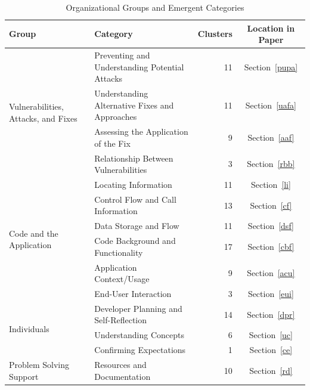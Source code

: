 \documentclass[10pt,journal,compsoc]{IEEEtran}
\begin{document}
\begin{table} 
	\centering
	\caption{Organizational Groups and Emergent Categories}
	\begin{tabularx}{\textwidth}{|l|X|r|c|}
		\rowcolor{gray!50}
		\hline
		Group											& Category										& Clusters		& Location in Paper	  	\\
		\hline			
		\multirow{4}{*}{Vulnerabilities, Attacks, and Fixes}
		& Preventing and Understanding Potential Attacks	& 11     		& Section~\ref{pupa}		\\
		
		& Understanding Alternative Fixes and Approaches	& 11     		& Section~\ref{uafa}	\\
		
		& Assessing the Application of the Fix				& 9     		& Section~\ref{aaf}				\\
		
		& Relationship Between Vulnerabilities							& 3     		& Section~\ref{rbb}			\\
		\hline
		\multirow{6}{*}{Code and the Application}	
		& Locating Information 								& 11      		& Section~\ref{li}		\\
		
		& Control Flow and Call Information					& 13     		& Section~\ref{cf}	\\
		
		& Data Storage and Flow								& 11     		& Section~\ref{dsf}  	\\
		
		& Code Background and Functionality	 				& 17     		& Section~\ref{cbf}			\\
		
		& Application Context/Usage										& 9     		& Section~\ref{acu}			\\
		
		& End-User Interaction											& 3     		& Section~\ref{eui}		\\
		\hline	
		\multirow{3}{*}{Individuals}	
		& Developer Planning and Self-Reflection						& 14    		& Section~\ref{dpr}		\\
		
		& Understanding Concepts										& 6 			& Section~\ref{uc}			\\
		
		& Confirming Expectations					 					& 1				& Section~\ref{ce}  \\
		\hline
		\multirow{4}{*}{Problem Solving Support}
		
		& Resources and Documentation									& 10     		& Section~\ref{rd}		\\
		

\end{tabularx}
\end{table}
\end{document}
